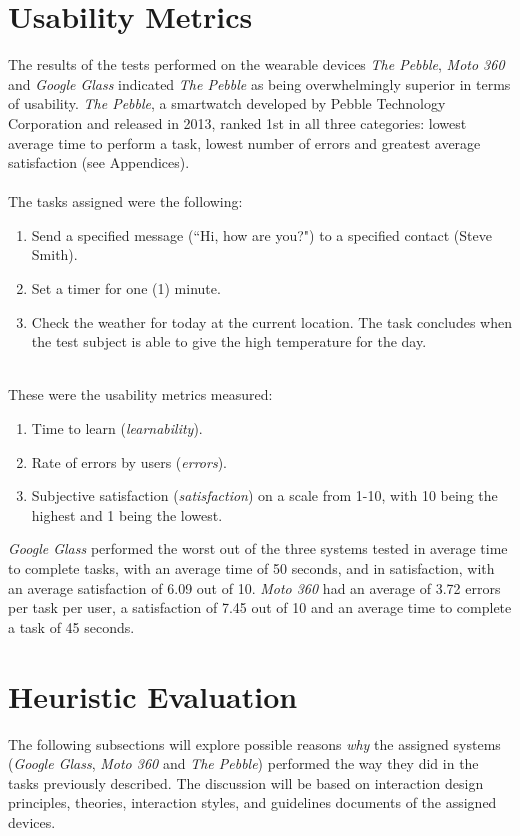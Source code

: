 \documentclass[11pt,a4paper]{scrartcl}
\begin{document}
\section{Usability Metrics}
The results of the tests performed on the wearable devices \textit{The Pebble}, \textit{Moto 360} and \textit{Google Glass} indicated \textit{The Pebble} as being overwhelmingly superior in terms of usability. \textit{The Pebble}, a smartwatch developed by Pebble Technology Corporation and released in 2013, ranked 1st in all three categories: lowest average time to perform a task, lowest number of errors and greatest average satisfaction (see Appendices).\\
\hspace*{\fill} \\
The tasks assigned were the following:
\begin{enumerate}
	\item Send a specified message (``Hi, how are you?") to a specified contact (Steve Smith). 
	\item Set a timer for one (1) minute.
	\item Check the weather for today at the current location. The task concludes when the test subject is able to give the high temperature for the day.
\end{enumerate}
\hspace*{\fill} \\
These were the usability metrics measured:
\begin{enumerate}
	\item Time to learn (\textit{learnability}).
	\item Rate of errors by users (\textit{errors}).
	\item Subjective satisfaction (\textit{satisfaction}) on a scale from 1-10, with 10 being the highest and 1 being the lowest.
\end{enumerate}
\textit{Google Glass} performed the worst out of the three systems tested in average time to complete tasks, with an average time of 50 seconds, and in satisfaction, with an average satisfaction of 6.09 out of 10. \textit{Moto 360} had an average of 3.72 errors per task per user, a satisfaction of 7.45 out of 10 and an average time to complete a task of 45 seconds.

\section{Heuristic Evaluation}
The following subsections will explore possible reasons \textit{why} the assigned systems (\textit{Google Glass}, \textit{Moto 360} and \textit{The Pebble}) performed the way they did in the tasks previously described. The discussion will be based on interaction design principles, theories, interaction styles, and guidelines documents of the assigned devices.
\end{document}
